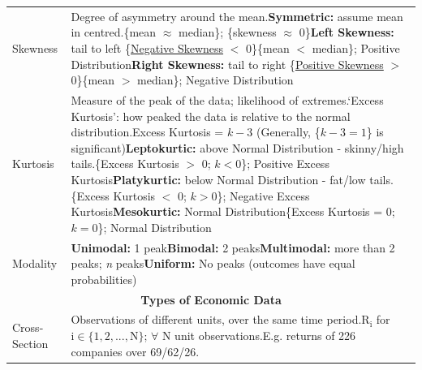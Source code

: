 \documentclass[11pt, english]{article}
\begin{document}
\begin{center}
\begin{longtable}{p{3cm}p{9cm}}
		Skewness & Degree of asymmetry around the mean.\newline \textbf{Symmetric: }assume mean in centred.\newline \{mean $\approx$ median\}; \{skewness $\approx$ 0\}\newline \textbf{Left Skewness: }tail to left \{\underline{Negative Skewness} $<$ 0\}\newline \{mean $<$ median\}; Positive Distribution\newline \textbf{Right Skewness: } tail to right \{\underline{Positive Skewness} $>$ 0\}\newline \{mean $>$ median\}; Negative Distribution\\
                Kurtosis & Measure of the peak of the data; likelihood of extremes.\newline `Excess Kurtosis’: how peaked the data is relative to the normal distribution.\newline Excess Kurtosis = $k-3$ (Generally, \{$k-3=1$\} is significant)\newline \textbf{Leptokurtic: }above Normal Distribution - skinny/high tails.\newline \{Excess Kurtosis $>$ 0; $k<0$\}; Positive Excess Kurtosis\newline \textbf{Platykurtic: }below Normal Distribution - fat/low tails.\newline \{Excess Kurtosis $<$ 0; $k>0$\}; Negative Excess Kurtosis\newline \textbf{Mesokurtic: }Normal Distribution\newline \{Excess Kurtosis = 0; $k=0$\}; Normal Distribution\\
                Modality & \textbf{Unimodal: }1 peak\newline \textbf{Bimodal: }2 peaks\newline \textbf{Multimodal: }more than 2 peaks; \textit{n} peaks\newline \textbf{Uniform: }No peaks (outcomes have equal probabilities)\\
                \hline
                \hline
                \multicolumn{2}{c}{\textbf{Types of Economic Data}}\\
                \hline
                \hline
                Cross-Section & Observations of different units, over the same time period.\newline $\mathrm{R_i}$ for $\mathrm{i\in\{1,2,...,N\}}$; $\forall$ N unit observations.\newline E.g. returns of 226 companies over 69/62/26.\\

\end{longtable}
\end{center}
\end{document}
